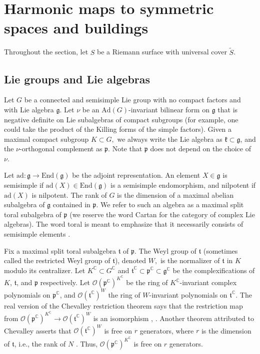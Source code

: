 \documentclass[10pt]{amsart}
\newcommand{\p}{\mathfrak{p}}
\newcommand{\g}{\mathfrak{g}}
\newcommand{\kk}{\mathfrak{k}}
\newcommand{\ft}{\mathfrak{t}}
\theoremstyle{definition}
\DeclareMathOperator{\C}{\mathbb{C}}
\begin{document}
\section{Harmonic maps to symmetric spaces and buildings}\label{hars}
Throughout the section, let $S$ be a Riemann surface with universal cover $\tilde{S}$. 

\subsection{Lie groups and Lie algebras}\label{Liegroupssection}
 Let $G$ be a connected and semisimple Lie group with no compact factors and with Lie algebra $\g$. Let $\nu$ be an $\textrm{Ad}(G)$-invariant bilinear form on $\g$ that is negative definite on Lie subalgebras of compact subgroups (for example, one could take the product of the Killing forms of the simple factors). Given a maximal compact subgroup $K\subset G,$ we always write the Lie algebra as $\kk\subset \g$, and the $\nu$-orthogonal complement as $\p$. Note that $\p$ does not depend on the choice of $\nu$.


Let $\textrm{ad}:\g\to \textrm{End}(\g)$ be the adjoint representation. An element $X\in\g$ is semisimple if $\textrm{ad}(X)\in \textrm{End}(\g)$ is a semisimple endomorphism, and nilpotent if $\textrm{ad}(X)$ is nilpotent. The rank of $G$ is the dimension of a maximal abelian subalgebra of $\g$ contained in $\p$. We refer to such an algebra as a maximal split toral subalgebra of $\p$ (we reserve the word Cartan for the category of complex Lie algebras). The word toral is meant to emphasize that it necessarily consists of semisimple elements \cite[Lemma 8.1]{Hu}.

Fix a maximal split toral subalgebra $\ft$ of $\p$. The Weyl group of $\ft$ (sometimes called the restricted Weyl group of $\ft$), denoted $W,$ is the normalizer of $\ft$ in $K$ modulo its centralizer. Let $K^{\C}\subset G^{\C}$ and $\ft^{\C}\subset \p^{\C}\subset \g^{\C}$ be the complexifications of $K$, $\ft$, and $\p$ respectively. Let $\mathcal{O}(\p^{\C})^{K^{\C}}$ be the ring of $K^{\C}$-invariant complex polynomials on $\p^{\C}$, and $\mathcal{O}(\ft^{\C})^W$ the ring of $W$-invariant polynomials on $\ft^{\C}$. The real version of the Chevalley restriction theorem says that the restriction map from $\mathcal{O}(\p^{\C})^{K^{\C}} \to \mathcal{O}(\ft^{\C})^W$ is an isomorphism \cite[Theorem 6.10]{Helg}, \cite[Theorem 7]{Vin}. Another theorem attributed to Chevalley asserts that $\mathcal{O}(\ft^{\C})^W$ is free on $r$ generators, where $r$ is the dimension of $\ft$, i.e., the rank of $N$ \cite[page 54]{Hum}. Thus, $\mathcal{O}(\p^{\C})^{K^{\C}}$ is free on $r$ generators.
\end{document}
